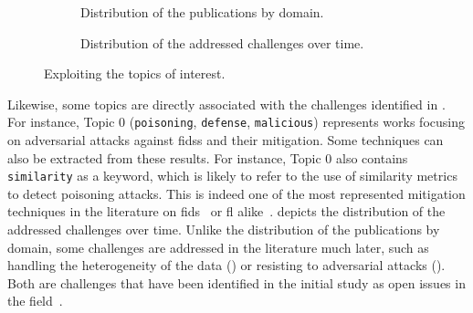 \begin{figure}
  \centering
  \begin{subfigure}{0.48\textwidth}
    \centering
    
    \caption{
      Distribution of the publications by domain.
      \label{fig:sota.domains}
    }
  \end{subfigure}
  \hfill
  \begin{subfigure}{0.48\textwidth}
    \centering
    
    \caption{
      Distribution of the addressed challenges over time.
      \label{fig:sota.challenges}
    }
  \end{subfigure}
  
  \caption{
    Exploiting the topics of interest.
    \label{fig:sota.challenges-domains}
  }
\end{figure}

Likewise, some topics are directly associated with the challenges identified in .
For instance, Topic 0 (\texttt{poisoning}, \texttt{defense}, \texttt{malicious}) represents works focusing on adversarial attacks against \glspl{fids} and their mitigation. 
Some techniques can also be extracted from these results.
For instance, Topic 0 also contains \texttt{similarity} as a keyword, which is likely to refer to the use of similarity metrics to detect poisoning attacks.
This is indeed one of the most represented mitigation techniques in the literature on \gls{fids}~\cite{yang_Dependablefederatedlearning_2023} or \gls{fl} alike~\cite{fung_LimitationsFederatedLearning_2020,nguyen_FLAMETamingBackdoors_2022}.
 depicts the distribution of the addressed challenges over time.
Unlike the distribution of the publications by domain, some challenges are addressed in the literature much later, such as handling the heterogeneity of the data () or resisting to adversarial attacks ().
Both are challenges that have been identified in the initial study as open issues in the field~\cite{lavaur_EvolutionFederatedLearningbased_2022,lavaur_Federatedlearningenabler_2022}.